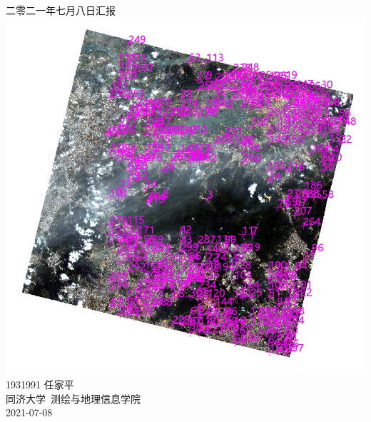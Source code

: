 \documentclass[a4paper, 12pt]{article}
\begin{document}
\begin{center}
    {\Huge 
        二零二一年七月八日汇报}\\[20pt]
    
    \includegraphics[scale=0.4]{pic/cover.jpg} \\[15pt] 

    {\Large 
        1931991 任家平\\[12pt]
        同济大学~测绘与地理信息学院\\[12pt]
        2021-07-08}
\end{center}
\thispagestyle{empty}



\newpage
{}
\tableofcontents
\newpage
{}



\listoffigures
{}
\listoftables
{}
\newpage
\nocite{*}

% 
\end{document}
